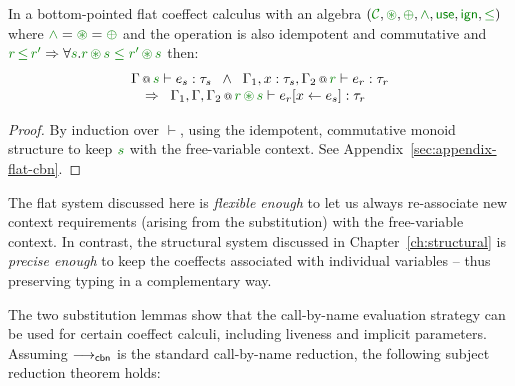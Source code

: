 \begin{lemma}
\label{thm:cbn-substitution-bot}
In a bottom-pointed flat coeffect calculus with an algebra $(\C, \cseq, \cpar, \czip, \cunit, \czero, \cleq)$ 
where $\czip = \cseq = \cpar$ and the operation is also idempotent and commutative and
$\cclrd{r}\,\cleq\,\cclrd{r'} \Rightarrow \forall\cclrd{s}.\cclrd{r}\,\cseq\,\cclrd{s}\;\cleq\;\cclrd{r'}\,\cseq\,\cclrd{s}$ then:
%
\begin{equation*}
\begin{array}{l}
\coctx{\Gamma}{\cclrd{s}} \vdash e_s : \tau_s \;\; \wedge \;\; 
\coctx{\Gamma_1,  x : \tau_s, \Gamma_2}{ \cclrd{r}  } \vdash e_r : \tau_r\\
\quad \Rightarrow \;\; \coctx{\Gamma_1,\Gamma,\Gamma_2}{ \cclrd{r} \,\cseq\, \cclrd{s} } \vdash \subst{e_r}{x}{e_s} : \tau_r
\end{array}
\end{equation*}

\end{lemma}
\begin{proof}
By induction over $\vdash$, using the idempotent, commutative monoid structure to keep $\cclrd{s}$ with
the free-variable context. See Appendix~\ref{sec:appendix-flat-cbn}.
\end{proof}

\noindent
The flat system discussed here is \emph{flexible enough} to let us always re-associate new context 
requirements (arising from the substitution) with the free-variable context. In contrast, the 
structural system discussed in Chapter~\ref{ch:structural} is \emph{precise enough} to keep the 
coeffects associated with individual variables -- thus preserving typing in a complementary way.

The two substitution lemmas show that the call-by-name evaluation strategy can be used for
certain coeffect calculi, including liveness and implicit parameters. Assuming
$\longrightarrow_{\textnormal{\sffamily cbn}}$ is the standard call-by-name reduction, the following subject reduction
theorem holds:

